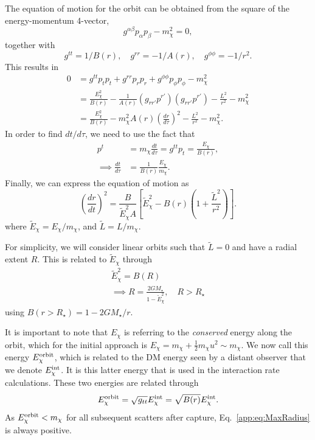 The equation of motion for the orbit can be obtained from the square of the energy-momentum 4-vector,
\begin{equation}
g^{\alpha\beta} p_\alpha p_\beta - m_\chi^2 = 0,
\end{equation}
together with
\begin{equation}    
g^{tt} = 1/B(r),\quad g^{rr} = -1/A(r),\quad g^{\phi \phi} = -1/r^2.
\end{equation}
This results in
\begin{align}
    0 & = g^{tt} p_t p_t + g^{rr} p_r p_r + g^{\phi\phi} p_\phi p_\phi - m_\chi^2 \\
    & = \frac{E_\chi^2}{B(r)} - \frac{1}{A(r)} \left( g_{rr'} p^{r'} \right)\left( g_{rr'} p^{r'} \right) - \frac{L^2}{r^2} - m_\chi^2 \\
    & = \frac{E_\chi^2}{B(r)} - m_\chi^2 A(r) \left( \frac{dr}{d\tau} \right)^2 - \frac{L^2}{r^2} - m_\chi^2.
\end{align}
In order to find $dt/d\tau$, we need to use the fact that
\begin{align}
    p^t & = m_\chi \frac{dt}{d\tau} = g^{tt}p_t = \frac{E_\chi}{B(r)},\\
    \implies \frac{dt}{d\tau} & = \frac{1}{B(r)}\frac{E_\chi}{m_\chi}.
\end{align}
Finally, we can express the equation of motion as
\begin{equation}
    \left(\frac{dr}{dt} \right)^2 = \frac{B}{\tilde E_\chi^2 A} \left[\tilde E_\chi^2- B(r) \left(  1 + \frac{\tilde L^2}{r^2} \right) \right].
    \label{app:eq:drdt2GR}
\end{equation}
where $\tilde{E}_\chi = E_\chi/m_\chi$, and $\tilde{L} = L/m_\chi$.

For simplicity, we will consider linear orbits such that $\tilde L = 0$ and have a radial extent $R$. This is related to $\tilde E_\chi$ through
\begin{gather}
    \tilde E_\chi^2 = B(R)\label{app:eq:maxradgeneral}\\
    \implies R = \frac{2 G M_\star}{1 - \tilde E_\chi^2}, \quad R>R_\star
    \label{app:eq:MaxRadius}
\end{gather}
using $B(r>R_\star) = 1 - 2 G M_\star /r$.

It is important to note that $E_\chi$ is referring to the \textit{conserved} energy along the orbit, 
which for the initial approach is $E_\chi = m_\chi + \frac{1}{2}m_\chi u^2\sim m_\chi$. 
We now call this energy $E_\chi^{\rm orbit}$, which is related to the DM energy seen by a distant observer that we denote $E_\chi^{\rm int}$. It is this latter energy that is used in the interaction rate calculations. These two energies are related through 
\begin{equation}
    E_\chi^{\rm orbit} = \sqrt{g_{tt}} E_\chi^{\rm int} = \sqrt{B(r)}E_\chi^{\rm int}.
\end{equation}
As $E_\chi^{\rm orbit} < m_\chi$ for all subsequent scatters after capture, Eq.~\ref{app:eq:MaxRadius} is always positive.


